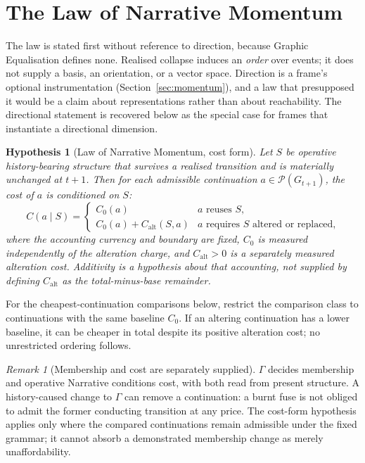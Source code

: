 \documentclass[11pt,a4paper]{article}
\newtheorem{hypothesis}[definition]{Hypothesis}
\theoremstyle{remark}
\newtheorem{remark}[definition]{Remark}
\newcommand{\Poss}{\mathcal P}
\begin{document}
\section{The Law of Narrative Momentum}\label{sec:law}

The law is stated first without reference to direction, because Graphic Equalisation defines none. Realised collapse induces an \emph{order} over events; it does not supply a basis, an orientation, or a vector space. Direction is a frame's optional instrumentation (Section~\ref{sec:momentum}), and a law that presupposed it would be a claim about representations rather than about reachability. The directional statement is recovered below as the special case for frames that instantiate a directional dimension.

\begin{hypothesis}[Law of Narrative Momentum, cost form]\label{hyp:narrative-momentum}
Let $S$ be operative history-bearing structure that survives a realised transition and is materially unchanged at $t+1$. Then for each admissible continuation $a\in\Poss(G_{t+1})$, the cost of $a$ is conditioned on $S$:
\[
\boxed{
C(a\mid S)
=
\begin{cases}
C_{0}(a) & \text{$a$ reuses $S$,}\\[2pt]
C_{0}(a)+C_{\mathrm{alt}}(S,a) & \text{$a$ requires $S$ altered or replaced,}
\end{cases}
}
\]
where the accounting currency and boundary are fixed, $C_0$ is measured independently of the alteration charge, and $C_{\mathrm{alt}}>0$ is a separately measured alteration cost. Additivity is a hypothesis about that accounting, not supplied by defining $C_{\mathrm{alt}}$ as the total-minus-base remainder.
\end{hypothesis}
For the cheapest-continuation comparisons below, restrict the comparison
class to continuations with the same baseline $C_0$. If an altering
continuation has a lower baseline, it can be cheaper in total despite its
positive alteration cost; no unrestricted ordering follows.



\begin{remark}[Membership and cost are separately supplied]\label{rem:membership-vs-cost}
$\Gamma$ decides membership and operative Narrative conditions cost, with
both read from present structure. A history-caused change to $\Gamma$ can
remove a continuation: a burnt fuse is not obliged to admit the former
conducting transition at any price. The cost-form hypothesis applies only
where the compared continuations remain admissible under the fixed grammar;
it cannot absorb a demonstrated membership change as merely unaffordability.
\end{remark}
\end{document}
